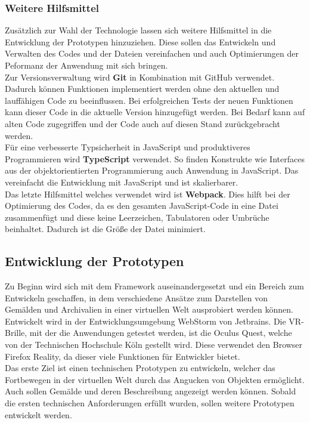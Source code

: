 \documentclass[a4paper,12pt,oneside]{article}
\begin{document}
      \subsubsection{Weitere Hilfsmittel}
        Zusätzlich zur Wahl der Technologie lassen sich weitere Hilfsmittel
        in die Entwicklung der Prototypen hinzuziehen. Diese sollen das
        Entwickeln und Verwalten des Codes und der Dateien vereinfachen und
        auch Optimierungen der Peformanz der Anwendung mit sich
        bringen. \\
        Zur Versionsverwaltung wird \textbf{Git} in Kombination mit GitHub
        verwendet. Dadurch können Funktionen implementiert werden ohne den
        aktuellen und lauffähigen Code zu beeinflussen. Bei erfolgreichen
        Tests der neuen Funktionen kann dieser Code in die aktuelle Version
        hinzugefügt werden. Bei Bedarf kann auf alten Code zugegriffen und
        der Code auch auf diesen Stand zurückgebracht werden. \\
        Für eine verbesserte Typsicherheit in JavaScript und produktiveres
        Programmieren wird \textbf{TypeScript} verwendet. So finden Konstrukte
        wie Interfaces aus der objektorientierten Programmierung auch
        Anwendung in JavaScript. Das vereinfacht die Entwicklung mit JavaScript
        und ist skalierbarer. \\
        Das letzte Hilfsmittel welches verwendet wird ist \textbf{Webpack}. Dies
        hilft bei der Optimierung des Codes, da es den gesamten JavaScript-Code
        in eine Datei zusammenfügt und diese keine Leerzeichen, Tabulatoren
        oder Umbrüche beinhaltet. Dadurch ist die Größe der Datei minimiert.
    \subsection{Entwicklung der Prototypen}
      Zu Beginn wird sich mit dem Framework auseinandergesetzt und ein Bereich
      zum Entwickeln geschaffen, in dem verschiedene Ansätze zum Darstellen von
      Gemälden und Archivalien in einer virtuellen Welt ausprobiert werden
      können. \\
      Entwickelt wird in der Entwicklungsumgebung WebStorm von Jetbrains. Die
      VR-Brille, mit der die Anwendungen getestet werden, ist die Oculus Quest,
      welche von der Technischen Hochschule Köln gestellt wird. Diese verwendet
      den Browser Firefox Reality, da dieser viele Funktionen für Entwickler 
      bietet. \\
      Das erste Ziel ist einen technischen Prototypen zu entwickeln, welcher das
      Fortbewegen in der virtuellen Welt durch das Angucken von Objekten ermöglicht.
      Auch sollen Gemälde und deren Beschreibung angezeigt werden können. Sobald
      die ersten technischen Anforderungen erfüllt wurden, 
      sollen weitere Prototypen entwickelt werden.
\end{document}
